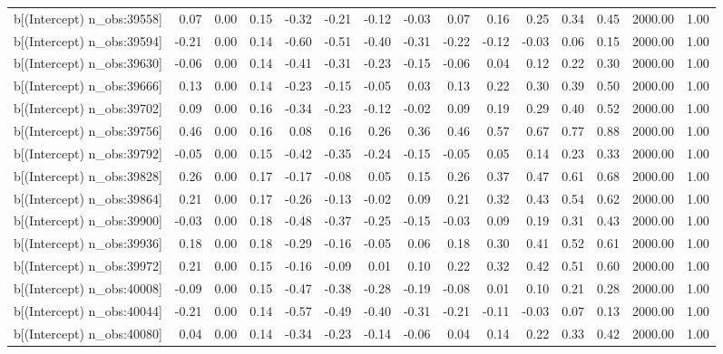 \begin{table}[ht]
\begin{tabular}{rrrrrrrrrrrrrrr}
  b[(Intercept) n\_obs:39558] & 0.07 & 0.00 & 0.15 & -0.32 & -0.21 & -0.12 & -0.03 & 0.07 & 0.16 & 0.25 & 0.34 & 0.45 & 2000.00 & 1.00 \\ 
  b[(Intercept) n\_obs:39594] & -0.21 & 0.00 & 0.14 & -0.60 & -0.51 & -0.40 & -0.31 & -0.22 & -0.12 & -0.03 & 0.06 & 0.15 & 2000.00 & 1.00 \\ 
  b[(Intercept) n\_obs:39630] & -0.06 & 0.00 & 0.14 & -0.41 & -0.31 & -0.23 & -0.15 & -0.06 & 0.04 & 0.12 & 0.22 & 0.30 & 2000.00 & 1.00 \\ 
  b[(Intercept) n\_obs:39666] & 0.13 & 0.00 & 0.14 & -0.23 & -0.15 & -0.05 & 0.03 & 0.13 & 0.22 & 0.30 & 0.39 & 0.50 & 2000.00 & 1.00 \\ 
  b[(Intercept) n\_obs:39702] & 0.09 & 0.00 & 0.16 & -0.34 & -0.23 & -0.12 & -0.02 & 0.09 & 0.19 & 0.29 & 0.40 & 0.52 & 2000.00 & 1.00 \\ 
  b[(Intercept) n\_obs:39756] & 0.46 & 0.00 & 0.16 & 0.08 & 0.16 & 0.26 & 0.36 & 0.46 & 0.57 & 0.67 & 0.77 & 0.88 & 2000.00 & 1.00 \\ 
  b[(Intercept) n\_obs:39792] & -0.05 & 0.00 & 0.15 & -0.42 & -0.35 & -0.24 & -0.15 & -0.05 & 0.05 & 0.14 & 0.23 & 0.33 & 2000.00 & 1.00 \\ 
  b[(Intercept) n\_obs:39828] & 0.26 & 0.00 & 0.17 & -0.17 & -0.08 & 0.05 & 0.15 & 0.26 & 0.37 & 0.47 & 0.61 & 0.68 & 2000.00 & 1.00 \\ 
  b[(Intercept) n\_obs:39864] & 0.21 & 0.00 & 0.17 & -0.26 & -0.13 & -0.02 & 0.09 & 0.21 & 0.32 & 0.43 & 0.54 & 0.62 & 2000.00 & 1.00 \\ 
  b[(Intercept) n\_obs:39900] & -0.03 & 0.00 & 0.18 & -0.48 & -0.37 & -0.25 & -0.15 & -0.03 & 0.09 & 0.19 & 0.31 & 0.43 & 2000.00 & 1.00 \\ 
  b[(Intercept) n\_obs:39936] & 0.18 & 0.00 & 0.18 & -0.29 & -0.16 & -0.05 & 0.06 & 0.18 & 0.30 & 0.41 & 0.52 & 0.61 & 2000.00 & 1.00 \\ 
  b[(Intercept) n\_obs:39972] & 0.21 & 0.00 & 0.15 & -0.16 & -0.09 & 0.01 & 0.10 & 0.22 & 0.32 & 0.42 & 0.51 & 0.60 & 2000.00 & 1.00 \\ 
  b[(Intercept) n\_obs:40008] & -0.09 & 0.00 & 0.15 & -0.47 & -0.38 & -0.28 & -0.19 & -0.08 & 0.01 & 0.10 & 0.21 & 0.28 & 2000.00 & 1.00 \\ 
  b[(Intercept) n\_obs:40044] & -0.21 & 0.00 & 0.14 & -0.57 & -0.49 & -0.40 & -0.31 & -0.21 & -0.11 & -0.03 & 0.07 & 0.13 & 2000.00 & 1.00 \\ 
  b[(Intercept) n\_obs:40080] & 0.04 & 0.00 & 0.14 & -0.34 & -0.23 & -0.14 & -0.06 & 0.04 & 0.14 & 0.22 & 0.33 & 0.42 & 2000.00 & 1.00 \\ 

\end{tabular}
\end{table}
